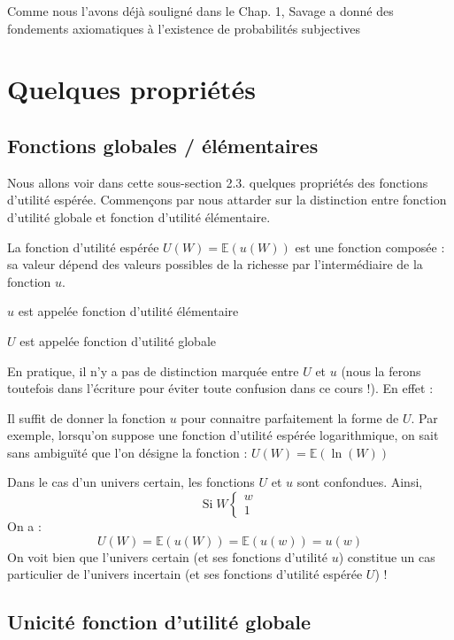 \documentclass[a4paper, 12pt]{report}
\begin{document}
Comme nous l'avons déjà souligné dans le Chap. 1, Savage a donné des fondements axiomatiques à l'existence de probabilités subjectives

\section{Quelques propriétés}

\subsection{Fonctions globales / élémentaires}

Nous allons voir dans cette sous-section 2.3. quelques propriétés des fonctions d'utilité espérée. Commençons par nous attarder sur la distinction entre fonction d'utilité globale et fonction d'utilité élémentaire.

La fonction d'utilité espérée $U(W)=\mathbb{E}\left( u(W)\right)$ est une
fonction composée : sa valeur dépend des valeurs possibles de la richesse par l'intermédiaire de la fonction $u$.

$u$ est appelée fonction d'utilité élémentaire

$U$ est appelée fonction d'utilité globale

En pratique, il n'y a pas de distinction marquée entre $U$ et $u$ (nous la ferons toutefois dans l'écriture pour éviter toute confusion dans ce cours !). En effet :

Il suffit de donner la fonction $u$ pour connaitre parfaitement la forme de $U$. Par exemple, lorsqu'on suppose une fonction d'utilité espérée logarithmique, on sait sans ambiguïté que l'on désigne la fonction : $U(W)=\mathbb{E}\left( \ln(W) \right)$

Dans le cas d'un univers certain, les fonctions $U$ et $u$ sont confondues. Ainsi,
$$
\text{Si}\;W\left\{\begin{matrix}
	w\\1
\end{matrix}\right.
$$
On a : 
$$
U(W)=\mathbb{E}\left ( u(W) \right )=\mathbb{E}\left ( u(w) \right )=u(w)
$$
On voit bien que l'univers certain (et ses fonctions d'utilité $u$) constitue un cas particulier de l'univers incertain (et ses fonctions d'utilité espérée $U$) !

\subsection{Unicité fonction d'utilité globale}
\end{document}
